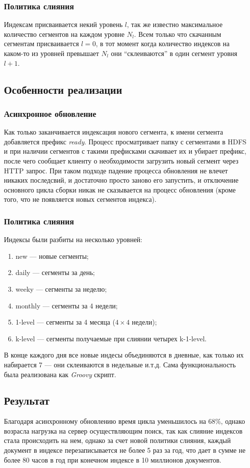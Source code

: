 \subsubsection{Политика слияния}
Индексам присваивается некий уровень $l$, так же известно максимальное количество сегментов на каждом уровне $N_{l}$. Всем только что скачанным сегментам присваивается $l=0$, в тот момент когда количество индексов на каком-то из уровней превышает $N_{l}$ они ``склеиваются'' в один сегмент уровня $l+1$.
\subsection{Особенности реализации}
\subsubsection{Асинхронное обновление}
Как только заканчивается индексация нового сегмента, к имени сегмента добавляется префикс \textit{ready}. Процесс просматривает папку с сегментами в HDFS и при наличии сегментов с такими префисками скачивает их и убирает префикс, после чего сообщает клиенту о необходимости загрузить новый сегмент через HTTP запрос. При таком подходе падение процесса обновления не влечет никаких последсвий, и достаточно просто заново его запустить, и отключение основного цикла сборки никак не сказывается на процесс обновления (кроме того, что не появляется новых сегментов индекса).
\subsubsection{Политика слияния}
Индексы были разбиты на несколько уровней:
\begin{enumerate}
 \item new --- новые сегменты;
 \item daily --- сегменты за день;
 \item weeky --- сегменты за неделю;
 \item monthly --- сегменты за 4 недели;
 \item 1-level --- сегменты за 4 месяца ($4\times4$ недели);
 \item k-level --- сегменты получаемые при слиянии четырех k-1-level.
\end{enumerate}
В конце каждого дня все новые индесы объединяются в дневные, как только их набирается 7 --- они склеиваются в недельные и.т.д. Сама функциональность была реализована как \textit{Groovy} скрипт.
\subsection{Результат}
Благодаря асинхронному обновлению время цикла уменьшилось на 68\%, однако возрасла нагрузка на сервер осуществляющим поиск, так как слияние индексов стала происходить на нем, однако за счет новой политики слияния, каждый документ в индексе перезаписывается не более 5 раз за год, что дает в сумме не более 80 часов в год при конечном индексе в 10 миллионов документов.
 
